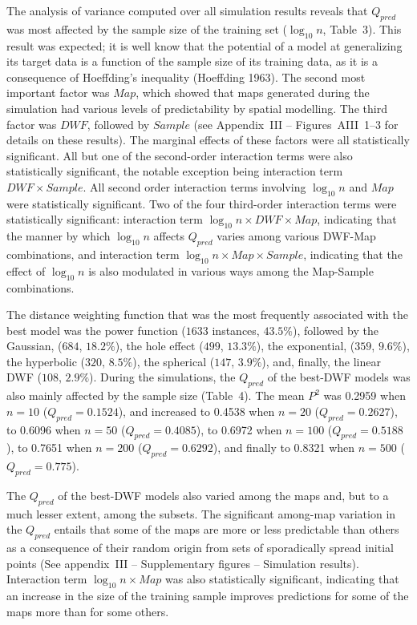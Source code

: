 \documentclass[
]{article}
\begin{document}
The analysis of variance computed over all simulation results reveals
that \(Q_{pred}\) was most affected by the sample size of the training
set (\(\log_{10}n\), Table~3). This result was expected; it is well know
that the potential of a model at generalizing its target data is a
function of the sample size of its training data, as it is a consequence
of Hoeffding's inequality (Hoeffding 1963). The second most important
factor was \(Map\), which showed that maps generated during the
simulation had various levels of predictability by spatial modelling.
The third factor was \(DWF\), followed by \(Sample\) (see Appendix~III
-- Figures~AIII~1--3 for details on these results). The marginal effects
of these factors were all statistically significant. All but one of the
second-order interaction terms were also statistically significant, the
notable exception being interaction term \(DWF \times Sample\). All
second order interaction terms involving \(\log_{10}n\) and \(Map\) were
statistically significant. Two of the four third-order interaction terms
were statistically significant: interaction term
\(\log_{10}n \times DWF \times Map\), indicating that the manner by
which \(\log_{10}n\) affects \(Q_{pred}\) varies among various DWF-Map
combinations, and interaction term
\(\log_{10}n \times Map \times Sample\), indicating that the effect of
\(\log_{10}n\) is also modulated in various ways among the Map-Sample
combinations.

The distance weighting function that was the most frequently associated
with the best model was the power function (\(1633\) instances,
\(43.5\%\)), followed by the Gaussian, (\(684\), \(18.2\%\)), the hole
effect (\(499\), \(13.3\%\)), the exponential, (\(359\), \(9.6\%\)), the
hyperbolic (\(320\), \(8.5\%\)), the spherical (\(147\), \(3.9\%\)),
and, finally, the linear DWF (\(108\), \(2.9\%\)). During the
simulations, the \(Q_{pred}\) of the best-DWF models was also mainly
affected by the sample size (Table~4). The mean \(P^2\) was 0.2959 when
\(n = 10\) (\(Q_{pred} = 0.1524\)), and increased to 0.4538 when
\(n = 20\) (\(Q_{pred} = 0.2627\)), to 0.6096 when \(n = 50\)
(\(Q_{pred} = 0.4085\)), to 0.6972 when \(n = 100\)
(\(Q_{pred} = 0.5188\)), to 0.7651 when \(n = 200\)
(\(Q_{pred} = 0.6292\)), and finally to 0.8321 when \(n = 500\)
(\(Q_{pred} = 0.775\)).

The \(Q_{pred}\) of the best-DWF models also varied among the maps and,
but to a much lesser extent, among the subsets. The significant
among-map variation in the \(Q_{pred}\) entails that some of the maps
are more or less predictable than others as a consequence of their
random origin from sets of sporadically spread initial points (See
appendix~III -- Supplementary figures -- Simulation results).
Interaction term \(\log_{10}n \times Map\) was also statistically
significant, indicating that an increase in the size of the training
sample improves predictions for some of the maps more than for some
others.
\end{document}
